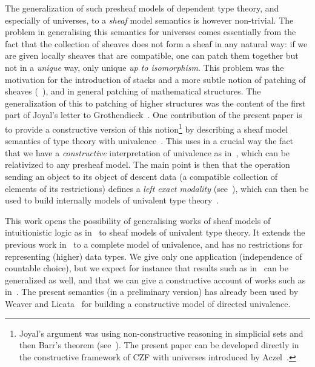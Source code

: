 \documentclass[10pt,a4paper,draft]{article}
\renewcommand{\~}{\widetilde}
\theoremstyle{definition}
\theoremstyle{remark} %
\begin{document}
The generalization of such presheaf models of dependent type theory, and especially
of universes, to a {\em sheaf} model semantics
is however non\hyp{}trivial. The problem in generalising this semantics for universes
comes essentially from the fact that the collection of sheaves does not form a sheaf
in any natural way: if we are given locally sheaves that are compatible, one can patch
them together but not in a {\em unique} way, only unique {\em up to isomorphism}.
This problem was the motivation for the introduction of stacks and a more
subtle notion of patching of sheaves (\cf~\cite[Section~3.3]{EGAI}), and in general
patching of mathematical structures. The generalization of this to patching of
higher structures was the content of the first part of Joyal's letter to Grothendieck~\cite{Joyal84}.
One contribution of the present paper is to provide
a constructive version of this notion\footnote{Joyal's argument was using non\hyp{}constructive reasoning in simplicial sets
  and then Barr's theorem (see~\cite{Barr74}).
  The present paper can be developed directly in the constructive framework of CZF with universes
introduced by Aczel~\cite{Aczel98}.}
by describing a
sheaf model semantics of type theory with univalence~\cite{Voevodsky15,HoTT}.
This uses in a crucial way the fact that
we have a {\em constructive} interpretation of univalence as in~\cite{CCHM15,OrtonP16}, which can
be relativized to any presheaf model. The main point is then that the operation sending an object to its object of descent data (a compatible collection of elements of its restrictions) defines
a {\em left exact modality} (see~\cite{HoTT,Quirin16,RijkeSS17}), which can then be used
to build internally models of univalent type theory~\cite{Quirin16}.

This work opens the possibility of generalising works of sheaf models of intuitionistic
logic as in~\cite{TroelstraD88b} to sheaf models of univalent type theory. It extends the previous
work in~\cite{CoquandMR17} to a complete model of univalence, and has no restrictions for
representing (higher) data types.
We give only one application (independence of countable choice), but we expect for instance that results
such as in~\cite{MannaaC13} can be generalized as well, and that we can give a constructive
account of works such as in~\cite{Shulman18,Wellen17}.
The present semantics (in a preliminary version)
has already been used by Weaver and Licata~\cite{WeaverL20} for building a constructive model of directed univalence.
\end{document}

